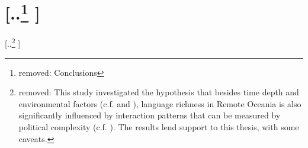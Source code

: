 \documentclass[unnumsec,webpdf,modern,medium]{oup-authoring-template}
\providecommand{\DIFdeltex}[1]{{\protect\color{red} [..\footnote{removed: #1} ]}} %
\providecommand{\DIFdel}[1]{\texorpdfstring{\DIFdeltex{#1}}{}} %
\begin{document}


\section{\DIFdel{Conclusions}}
\addtocounter{section}{-1}%
\DIFdel{This study investigated the hypothesis that besides time depth and environmental factors (c.f. \citet{curriemace2009, gavin2012island, hua2019ecological} and \citet{Pacheco_Coelho_2019}), language richness in Remote Oceania is also significantly influenced by interaction patterns that can be measured by political complexity (c.f. \citet{pawley81, pawley2007}). The results lend support to this thesis, with some caveats. 
}%
\end{document}

